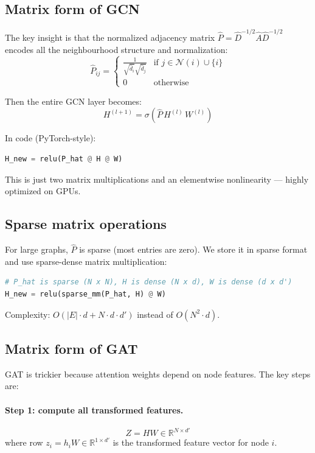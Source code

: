 \begin{notechapter}
\subsection{Matrix form of GCN}

The key insight is that the normalized adjacency matrix
$\hat{P} = \hat{D}^{-1/2} \hat{A} \hat{D}^{-1/2}$ encodes all the
neighbourhood structure and normalization:
\[
\hat{P}_{ij} = \begin{cases}
\frac{1}{\sqrt{\hat{d}_i}\sqrt{\hat{d}_j}} & \text{if } j \in \mathcal{N}(i) \cup \{i\} \\
0 & \text{otherwise}
\end{cases}
\]

Then the entire GCN layer becomes:
\[
H^{(l+1)} = \sigma\left( \hat{P} \, H^{(l)} \, W^{(l)} \right)
\]

In code (PyTorch-style):
\begin{lstlisting}[language=Python]
H_new = relu(P_hat @ H @ W)
\end{lstlisting}

This is just two matrix multiplications and an elementwise nonlinearity --- highly
optimized on GPUs.

\subsection{Sparse matrix operations}

For large graphs, $\hat{P}$ is sparse (most entries are zero). We store
it in sparse format and use sparse-dense matrix multiplication:

\begin{lstlisting}[language=Python]
# P_hat is sparse (N x N), H is dense (N x d), W is dense (d x d')
H_new = relu(sparse_mm(P_hat, H) @ W)
\end{lstlisting}

Complexity: $O(|E| \cdot d + N \cdot d \cdot d')$ instead of $O(N^2 \cdot d)$.

\subsection{Matrix form of GAT}

GAT is trickier because attention weights depend on node features. The
key steps are:

\paragraph{Step 1: compute all transformed features.}
\[
Z = H W \in \mathbb{R}^{N \times d'}
\]
where row $z_i = h_i W \in \mathbb{R}^{1 \times d'}$ is the transformed
feature vector for node $i$.


\end{notechapter}

